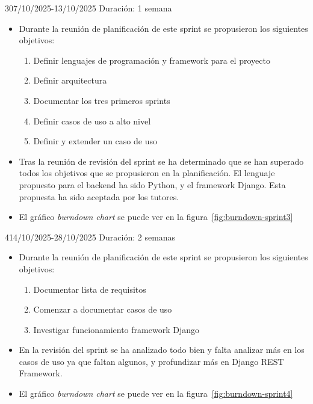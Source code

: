 \begin{Sprint}{3}{07/10/2025-13/10/2025}
	Duración: 1 semana
\begin{itemize}	
	\item{}
	Durante la reunión de planificación de este sprint se propusieron los siguientes objetivos:
	\begin{enumerate}
		\item Definir lenguajes de programación y framework para el proyecto
		\item Definir arquitectura 
		\item Documentar los tres primeros sprints
		\item Definir casos de uso a alto nivel
		\item Definir y extender un caso de uso
	\end{enumerate}

	\item{}
	Tras la reunión de revisión del sprint se ha determinado que se han superado todos los objetivos que se propusieron en la planificación. El lenguaje propuesto para el backend ha sido Python, y el framework Django. Esta propuesta ha sido aceptada por los tutores.
	
	\item{}
	El gráfico \textit{burndown chart} se puede ver en la figura~\ref{fig:burndown-sprint3}
	
\end{itemize}

\end{Sprint}

\begin{Sprint}{4}{14/10/2025-28/10/2025}
	Duración: 2 semanas
	\begin{itemize}	
		\item{}
		Durante la reunión de planificación de este sprint se propusieron los siguientes objetivos:
		\begin{enumerate}
			\item Documentar lista de requisitos
			\item Comenzar a documentar casos de uso
			\item Investigar funcionamiento framework Django
		\end{enumerate}
		\item{}
		En la revisión del sprint se ha analizado todo bien y falta analizar más en los casos de uso ya que faltan algunos, y profundizar más en Django REST Framework.
		\item{}
		El gráfico \textit{burndown chart} se puede ver en la figura~\ref{fig:burndown-sprint4} 
	\end{itemize}
\end{Sprint}

